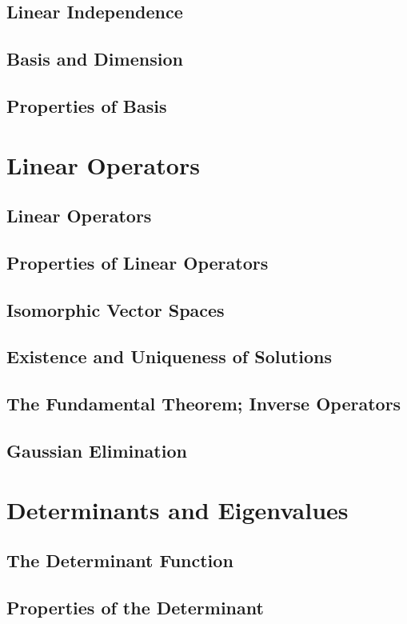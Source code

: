 \documentclass{book}
\theoremstyle{definition}
\theoremstyle{remark}
\begin{document}
\newpage
\subsection{Linear Independence}
\subsection{Basis and Dimension}
\subsection{Properties of Basis}

\section{Linear Operators}
\subsection{Linear Operators}
\subsection{Properties of Linear Operators}
\subsection{Isomorphic Vector Spaces}
\subsection{Existence and Uniqueness of Solutions}
\subsection{The Fundamental Theorem; Inverse Operators}
\subsection{Gaussian Elimination}

\section{Determinants and Eigenvalues}
\subsection{The Determinant Function}
\subsection{Properties of the Determinant}
\end{document}
